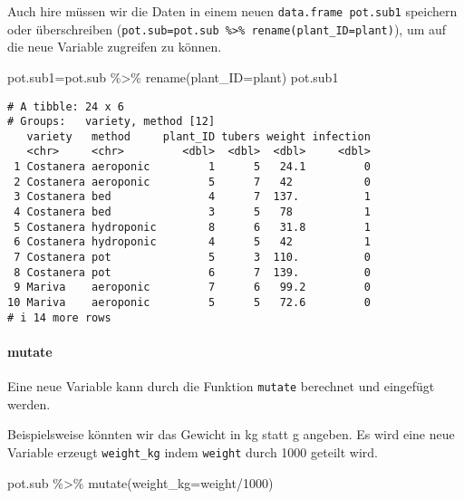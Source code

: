 \documentclass[
  letterpaper,
  DIV=11,
  numbers=noendperiod]{scrartcl}
\let\oldparagraph\paragraph
\renewcommand{\paragraph}[1]{\oldparagraph{#1}\mbox{}}
\newenvironment{Shaded}{\begin{snugshade}}{\end{snugshade}}
\newcommand{\AttributeTok}[1]{\textcolor[rgb]{0.40,0.45,0.13}{#1}}
\newcommand{\DecValTok}[1]{\textcolor[rgb]{0.68,0.00,0.00}{#1}}
\newcommand{\FunctionTok}[1]{\textcolor[rgb]{0.28,0.35,0.67}{#1}}
\newcommand{\NormalTok}[1]{\textcolor[rgb]{0.00,0.23,0.31}{#1}}
\newcommand{\OtherTok}[1]{\textcolor[rgb]{0.00,0.23,0.31}{#1}}
\newcommand{\SpecialCharTok}[1]{\textcolor[rgb]{0.37,0.37,0.37}{#1}}
\begin{document}
Auch hire müssen wir die Daten in einem neuen
\texttt{data.frame\ pot.sub1} speichern oder überschreiben
(\texttt{pot.sub=pot.sub\ \%\textgreater{}\%\ rename(plant\_ID=plant)}),
um auf die neue Variable zugreifen zu können.

\begin{Shaded}
\begin{Highlighting}[]
\NormalTok{pot.sub1}\OtherTok{=}\NormalTok{pot.sub }\SpecialCharTok{\%\textgreater{}\%} \FunctionTok{rename}\NormalTok{(}\AttributeTok{plant\_ID=}\NormalTok{plant)}
\NormalTok{pot.sub1}
\end{Highlighting}
\end{Shaded}

\begin{verbatim}
# A tibble: 24 x 6
# Groups:   variety, method [12]
   variety   method     plant_ID tubers weight infection
   <chr>     <chr>         <dbl>  <dbl>  <dbl>     <dbl>
 1 Costanera aeroponic         1      5   24.1         0
 2 Costanera aeroponic         5      7   42           0
 3 Costanera bed               4      7  137.          1
 4 Costanera bed               3      5   78           1
 5 Costanera hydroponic        8      6   31.8         1
 6 Costanera hydroponic        4      5   42           1
 7 Costanera pot               5      3  110.          0
 8 Costanera pot               6      7  139.          0
 9 Mariva    aeroponic         7      6   99.2         0
10 Mariva    aeroponic         5      5   72.6         0
# i 14 more rows
\end{verbatim}

\hypertarget{mutate}{%
\paragraph{mutate}\label{mutate}}

Eine neue Variable kann durch die Funktion \texttt{mutate} berechnet und
eingefügt werden.

Beispielsweise könnten wir das Gewicht in kg statt g angeben. Es wird
eine neue Variable erzeugt \texttt{weight\_kg} indem \texttt{weight}
durch 1000 geteilt wird.

\begin{Shaded}
\begin{Highlighting}[]
\NormalTok{pot.sub }\SpecialCharTok{\%\textgreater{}\%} 
  \FunctionTok{mutate}\NormalTok{(}\AttributeTok{weight\_kg=}\NormalTok{weight}\SpecialCharTok{/}\DecValTok{1000}\NormalTok{)}
\end{Highlighting}
\end{Shaded}
\end{document}
